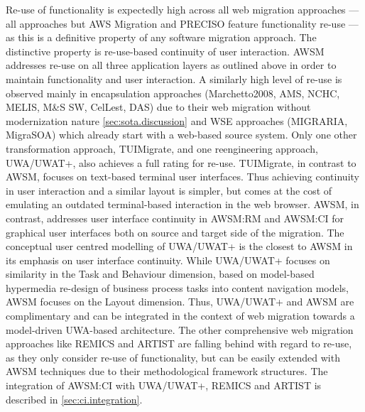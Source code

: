 Re-use of functionality is expectedly high across all web migration approaches --- all approaches but AWS Migration and PRECISO feature functionality re-use --- as this is a definitive property of any software migration approach.
The distinctive property is re-use-based continuity of user interaction.
AWSM addresses re-use on all three application layers as outlined above in order to maintain functionality and user interaction.
A similarly high level of re-use is observed mainly in encapsulation approaches (Marchetto2008, AMS, NCHC, MELIS, M\&S SW, CelLest, DAS) due to their web migration without modernization nature \cref{sec:sota.discussion} and WSE approaches (MIGRARIA, MigraSOA) which already start with a web-based source system.
Only one other transformation approach, TUIMigrate, and one reengineering approach, UWA/UWAT+, also achieves a full rating for re-use.
TUIMigrate, in contrast to AWSM, focuses on text-based terminal user interfaces.
Thus achieving continuity in user interaction and a similar layout is simpler, but comes at the cost of emulating an outdated terminal-based interaction in the web browser.
AWSM, in contrast, addresses user interface continuity in AWSM:RM and AWSM:CI for graphical user interfaces both on source and target side of the migration.
The conceptual user centred modelling of UWA/UWAT+ is the closest to AWSM in its emphasis on user interface continuity.
While UWA/UWAT+ focuses on similarity in the Task and Behaviour dimension, based on model-based hypermedia re-design of business process tasks into content navigation models, AWSM focuses on the Layout dimension.
Thus, UWA/UWAT+ and AWSM are complimentary and can be integrated in the context of web migration towards a model-driven UWA-based architecture.
The other comprehensive web migration approaches like REMICS and ARTIST are falling behind with regard to re-use, as they only consider re-use of functionality, but can be easily extended with AWSM techniques due to their methodological framework structures.
The integration of AWSM:CI with UWA/UWAT+, REMICS and ARTIST is described in \cref{sec:ci.integration}.

